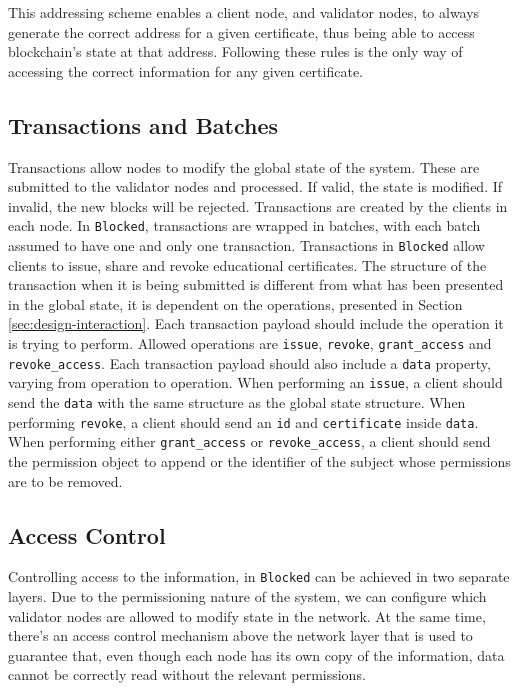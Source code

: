 This addressing scheme enables a client node, and validator nodes, to always generate the correct address for a given certificate, thus being able to access blockchain's state at that address. Following these rules is the only way of accessing the correct information for any given certificate.

\subsection{Transactions and Batches}
\label{sec:design-transactions}

Transactions allow nodes to modify the global state of the system. These are submitted to the validator nodes and processed. If valid, the state is modified. If invalid, the new blocks will be rejected. Transactions are created by the clients in each node. In \texttt{Blocked}, transactions are wrapped in batches, with each batch assumed to have one and only one transaction. Transactions in \texttt{Blocked} allow clients to issue, share and revoke educational certificates. The structure of the transaction when it is being submitted is different from what has been presented in the global state, it is dependent on the operations, presented in Section \ref{sec:design-interaction}. Each transaction payload should include the operation it is trying to perform. Allowed operations are \texttt{issue}, \texttt{revoke}, \texttt{grant\_access} and \texttt{revoke\_access}. Each transaction payload should also include a \texttt{data} property, varying from operation to operation. When performing an \texttt{issue}, a client should send the \texttt{data} with the same structure as the global state structure. When performing \texttt{revoke}, a client should send an \texttt{id} and \texttt{certificate} inside \texttt{data}. When performing either \texttt{grant\_access} or \texttt{revoke\_access}, a client should send the permission object to append or the identifier of the subject whose permissions are to be removed.

\subsection{Access Control}
\label{sec:design-ac}

Controlling access to the information, in \texttt{Blocked} can be achieved in two separate layers. Due to the permissioning nature of the system, we can configure which validator nodes are allowed to modify state in the network. At the same time, there's an access control mechanism above the network layer that is used to guarantee that, even though each node has its own copy of the information, data cannot be correctly read without the relevant permissions.

